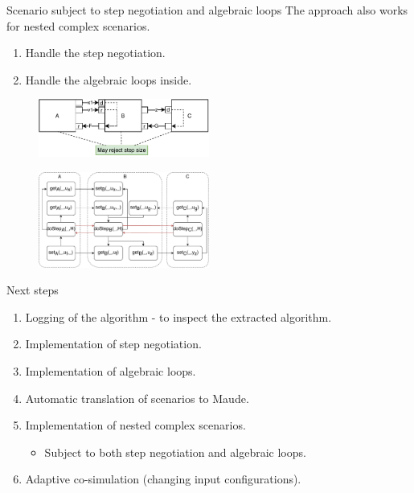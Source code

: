 \documentclass{beamer}
\begin{document}
\begin{frame}{Scenario subject to step negotiation and algebraic loops}
    The approach also works for nested complex scenarios.
    \begin{enumerate}
        \item Handle the step negotiation.
        \item Handle the algebraic loops inside.
    \end{enumerate}

    \begin{figure}    
        \includegraphics[width=0.5\textwidth]{images/loop_within_loop.pdf}
    \end{figure}
    \begin{figure}   
        \includegraphics[width=0.5\textwidth]{images/nested_graph.pdf}
    \end{figure}
\end{frame}

\begin{frame}{Next steps}
    \begin{enumerate}
        \item Logging of the algorithm - to inspect the extracted algorithm.
        \item Implementation of step negotiation.
        \item Implementation of algebraic loops.
        \item Automatic translation of scenarios to Maude.
        \item Implementation of nested complex scenarios.
        \begin{itemize}
            \item Subject to both step negotiation and algebraic loops.
        \end{itemize}
        \item Adaptive co-simulation (changing input configurations).
    \end{enumerate}  
\end{frame}
\end{document}
